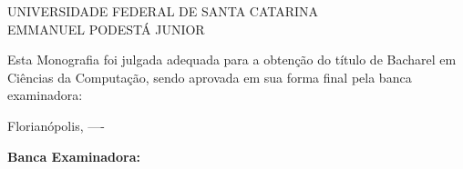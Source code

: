 
%
% 
%
\begin{folhadeaprovacao}


\begin{center}


            {UNIVERSIDADE FEDERAL DE SANTA CATARINA} \\
           

    \vspace{1.5cm}
                                    {EMMANUEL PODESTÁ JUNIOR}\\
    \bfseries{}
\end{center}

Esta Monografia foi julgada adequada para a obten\c{c}\~{a}o do título  de Bacharel em Ciências da Computação, sendo aprovada em sua forma final pela banca examinadora:

    \begin{center}
        Florianópolis, ----
    \end{center}
    
    \textbf{Banca Examinadora:}
    \vspace{1.5cm}
    \vspace{3 cm}%

  
\end{folhadeaprovacao}